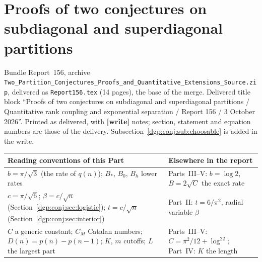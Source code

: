 \documentclass[11pt,letterpaper]{article}
\numberwithin{equation}{section}
\theoremstyle{remark}\newtheorem{remark}[theorem]{Remark}
\newcommand{\file}[1]{\nolinkurl{#1}}
\newcommand{\partsource}[1]{\par\noindent\begin{minipage}{\textwidth}\small #1\end{minipage}\par\medskip}
\begin{document}
\part{Proofs of two conjectures on subdiagonal and superdiagonal partitions}\label{dgp:conj:part}
\partsource{Bundle Report~156, archive \file{Two_Partition_Conjectures_Proofs_and_Quantitative_Extensions_Source.zip}, delivered as \file{Report156.tex} (14 pages), the base of the merge. Delivered title block ``Proofs of two conjectures on subdiagonal and superdiagonal partitions / Quantitative rank coupling and exponential separation / Report 156 / 3 October 2026''. Printed as delivered, with \textbf{[write]} notes; section, statement and equation numbers are those of the delivery. Subsection~\ref{dgp:conj:sub:choosable} is added in the write.}
\begin{center}
\small
\begin{tabular}{@{}>{\raggedright\arraybackslash}p{} >{\raggedright\arraybackslash}p{}@{}}
\toprule
Reading conventions of this Part & Elsewhere in the report\\
\midrule
$b=\pi/\sqrt3$ (the rate of $q(n)$); $B_*$, $B_0$, $B_h$ lower rates & Parts~III--V: $b=\log2$, $B=2\sqrt C$ the exact rate\\
$c=\pi/\sqrt6$; $\beta=c/\sqrt n$ (Section~\ref{dgp:conj:sec:logistic}); $t=c/\sqrt n$ (Section~\ref{dgp:conj:sec:interior}) & Part~II: $t=6/\pi^2$, radial variable $\beta$\\
$C$ a generic constant; $C_M$ Catalan numbers; $D(n)=p(n)-p(n-1)$; $K$, $m$ cutoffs; $L$ the largest part & Parts~III--V: $C=\pi^2/12+\log^22$; Part~IV: $K$ the length\\
\bottomrule
\end{tabular}
\end{center}
\end{document}

